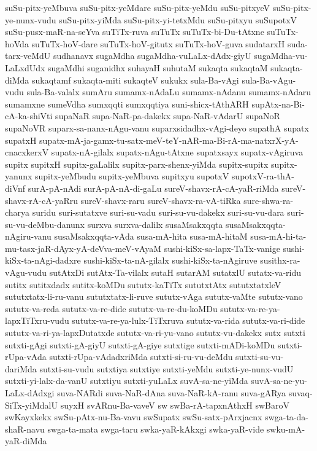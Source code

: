 {suSu-pitx-yeMbuva
suSu-pitx-yeMdare
suSu-pitx-yeMdu
suSu-pitxyeV
suSu-pitx-ye-nunx-vudu
suSu-pitx-yiMda
suSu-pitx-yi-tetxMdu
suSu-pitxyu
suSupotxV
suSu-pusx-maR-na-seYva
suTiTx-ruva
suTuTx
suTuTx-bi-Du-tAtxne
suTuTx-hoVda
suTuTx-hoV-dare
suTuTx-hoV-gitutx
suTuTx-hoV-guva
sudatarxH
suda-tarx-veMdU
sudhanavx
sugaMdha
sugaMdha-vuLaLx-dAdx-giyU
sugaMdha-vu-LaLxdUdx
sugaMdhi
suganidhx
suhayaH
suhutaM
sukaqta
sukaqtaM
sukaqta-diMda
sukaqtamf
sukaqta-miti
sukaqteV
sukukx
sula-Ba-vAgi
sula-Ba-vAgu-vudu
sula-Ba-valalx
sumAru
sumamx-nAdaLu
sumamx-nAdanu
sumamx-nAdaru
sumamxne
sumeVdha
sumxqqti
sumxqqtiya
suni-shicx-tAthARH
supAtx-na-Bi-cA-ka-shiVti
supaNaR
supa-NaR-pa-dakekx
supa-NaR-vAdarU
supaNoR
supaNoVR
suparx-sa-nanx-nAgu-vanu
suparxsidadhx-vAgi-deyo
supathA
supatx
supatxH
supatx-mA-ja-gamx-tu-satx-meV-teY-nAR-ma-Bi-rA-ma-natxrX-yA-cnacxkerxV
supatx-nA-gilalx
supatx-nAgu-tAtxne
supatxsayx
supatx-vAgiruva
supitx
supitxH
supitx-gaLalilx
supitx-parx-shenx-yiMda
supitx-supitx
supitx-yanunx
supitx-yeMbudu
supitx-yeMbuva
supitxyu
supotxV
supotxV-ra-thA-diVnf
surA-pA-nAdi
surA-pA-nA-di-gaLu
sureV-shavx-rA-cA-yaR-riMda
sureV-shavx-rA-cA-yaRru
sureV-shavx-raru
sureV-shavx-ra-vA-tiRka
sure-shwa-ra-charya
suridu
suri-sutatxve
suri-su-vadu
suri-su-vu-dakekx
suri-su-vu-dara
suri-su-vu-deMbu-danunx
surxva
surxva-dalilx
susaMsakxqqta
susaMsakxqqta-nAgiru-vanu
susaMsakxqqta-vAda
susa-mA-hita
susa-mA-hitaM
susa-mA-hi-ta-mu-tasx-jaR-dAyx-yA-deVva-meV-vAyaM
sushi-kiSx-sa-lapx-TaTx-vanige
sushi-kiSx-ta-nAgi-dadxre
sushi-kiSx-ta-nA-gilalx
sushi-kiSx-ta-nAgiruve
susithx-ra-vAgu-vudu
sutAtxDi
sutAtx-Ta-vilalx
sutaH
sutarAM
sutatxlU
sutatx-va-ridu
sutitx
sutitxdadx
sutitx-koMDu
sututx-kaTiTx
sututxtAtx
sututxtatxleV
sututxtatx-li-ru-vanu
sututxtatx-li-ruve
sututx-vAga
sututx-vaMte
sututx-vano
sututx-va-reda
sututx-va-re-dide
sututx-va-re-du-koMDu
sututx-va-re-ya-lapxTiTxru-vudu
sututx-va-re-ya-lulx-TiTxruva
sututx-va-rida
sututx-va-ri-dide
sututx-va-ri-ya-lapxDutatxde
sututx-va-ri-yu-vano
sututx-vu-dakekx
sutx
sutxti
sutxti-gAgi
sutxti-gA-giyU
sutxti-gA-giye
sutxtige
sutxti-mADi-koMDu
sutxti-rUpa-vAda
sutxti-rUpa-vAdadxriMda
sutxti-si-ru-vu-deMdu
sutxti-su-vu-dariMda
sutxti-su-vudu
sutxtiya
sutxtiye
sutxti-yeMdu
sutxti-ye-nunx-vudU
sutxti-yi-lalx-da-vanU
sutxtiyu
sutxti-yuLaLx
suvA-sa-ne-yiMda
suvA-sa-ne-yu-LaLx-dAdxgi
suva-NARdi
suva-NaR-dAna
suva-NaR-kA-ranu
suva-gARya
suvaq-SiTx-yiMdalU
suyxH
svARnu-Ba-vaveV
sw
swBa-rA-tapxnAthxH
swBaroV
swKayxkekx
swSu-pAtx-nu-Ba-vavu
swSupatx
swSu-satx-pArxjacnx
swga-ta-da-shaR-navu
swga-ta-mata
swga-taru
swka-yaR-kAkxgi
swka-yaR-vide
swku-mA-yaR-diMda
}
